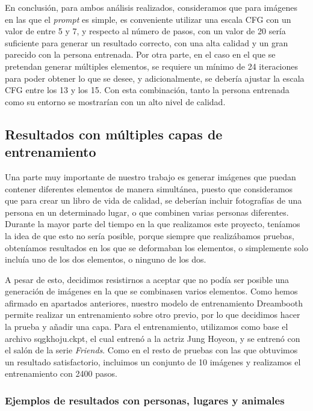En conclusión, para ambos análisis realizados, consideramos que para imágenes en las que el \textit{prompt} es simple, es conveniente utilizar una escala CFG con un valor de entre 5 y 7, y respecto al número de pasos, con un valor de 20 sería suficiente para generar un resultado correcto, con una alta calidad y un gran parecido con la persona entrenada. Por otra parte, en el caso en el que se pretendan generar múltiples elementos, se requiere un mínimo de 24 iteraciones para poder obtener lo que se desee, y adicionalmente, se debería ajustar la escala CFG entre los 13 y los 15. Con esta combinación, tanto la persona entrenada como su entorno se mostrarían con un alto nivel de calidad.


\subsection{Resultados con múltiples capas de entrenamiento}

Una parte muy importante de nuestro trabajo es generar imágenes que puedan contener diferentes elementos de manera simultánea, puesto que consideramos que para crear un libro de vida de calidad, se deberían incluir fotografías de una persona en un determinado lugar, o que combinen varias personas diferentes. Durante la mayor parte del tiempo en la que realizamos este proyecto, teníamos la idea de que esto no sería posible, porque siempre que realizábamos pruebas, obteníamos resultados en los que se deformaban los elementos, o simplemente solo incluía uno de los dos elementos, o ninguno de los dos. 

A pesar de esto, decidimos resistirnos a aceptar que no podía ser posible una generación de imágenes en la que se combinasen varios elementos. Como hemos afirmado en apartados anteriores, nuestro modelo de entrenamiento Dreambooth permite realizar un entrenamiento sobre otro previo, por lo que decidimos hacer la prueba y añadir una capa. Para el entrenamiento, utilizamos como base el archivo sqgkhoju.ckpt, el cual entrenó a la actriz Jung Hoyeon, y se entrenó con el salón de la serie \textit{Friends}. Como en el resto de pruebas con las que obtuvimos un resultado satisfactorio, incluimos un conjunto de 10 imágenes y realizamos el entrenamiento con 2400 pasos.\\

\subsubsection{Ejemplos de resultados con personas, lugares y animales}

